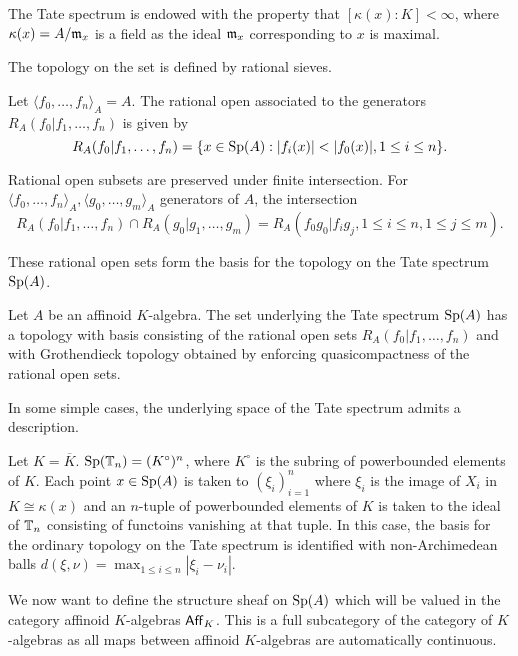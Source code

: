 \begin{remark}
    The Tate spectrum is endowed with the property that $[\kappa(x):K]<\infty$, where $\kappa(x)=A/\mathfrak{m}_{x}$ is a field as the ideal $\mathfrak{m}_{x}$ corresponding to $x$ is maximal. 
\end{remark}
The topology on the set is defined by rational sieves. 
\begin{definition}\label{def: rational set}
    Let $\langle f_{0},\dots,f_{n}\rangle_{A}=A$. The rational open associated to the generators $R_{A}(f_{0}|f_{1},\dots,f_{n})$ is given by 
    $$R_{A}(f_{0}|f_{1},\dots,f_{n})=\{x\in\Sp(A):|f_{i}(x)|<|f_{0}(x)|,1\leq i\leq n\}.$$
\end{definition}
\begin{remark}
    Rational open subsets are preserved under finite intersection. For $\langle f_{0},\dots,f_{n}\rangle_{A},\langle g_{0},\dots,g_{m}\rangle_{A}$ generators of $A$, the intersection 
    $$R_{A}(f_{0}|f_{1},\dots,f_{n})\cap R_{A}(g_{0}|g_{1},\dots,g_{m})=R_{A}(f_{0}g_{0}|f_{i}g_{j}, 1\leq i\leq n, 1\leq j\leq m).$$
\end{remark}
These rational open sets form the basis for the topology on the Tate spectrum $\mathrm{Sp}(A)$. 
\begin{definition}\label{def: topology of Tate spectrum}
    Let $A$ be an affinoid $K$-algebra. The set underlying the Tate spectrum $\mathrm{Sp}(A)$ has a topology with basis consisting of the rational open sets $R_{A}(f_{0}|f_{1},\dots,f_{n})$ and with Grothendieck topology obtained by enforcing quasicompactness of the rational open sets. 
\end{definition}
In some simple cases, the underlying space of the Tate spectrum admits a description. 
\begin{example}
    Let $K=\overline K$. $\mathrm{Sp}(\mathbb{T}_{n})= (K^{\circ})^{n}$, where $K^{\circ}$ is the subring of powerbounded elements of $K$. Each point $x\in\mathrm{Sp}(A)$ is taken to $(\xi_{i})_{i=1}^{n}$ where $\xi_{i}$ is the image of $X_{i}$ in $K\cong\kappa(x)$ and an $n$-tuple of powerbounded elements of $K$ is taken to the ideal of $\mathbb{T}_{n}$ consisting of functoins vanishing at that tuple. In this case, the basis for the ordinary topology on the Tate spectrum is identified with non-Archimedean balls $d(\xi,\nu)=\max_{1\leq i\leq n}|\xi_{i}-\nu_{i}|$. 
\end{example}
We now want to define the structure sheaf on $\mathrm{Sp}(A)$ which will be valued in the category affinoid $K$-algebras $\mathsf{Aff}_{K}$. This is a full subcategory of the category of $K$-algebras as all maps between affinoid $K$-algebras are automatically continuous. 

